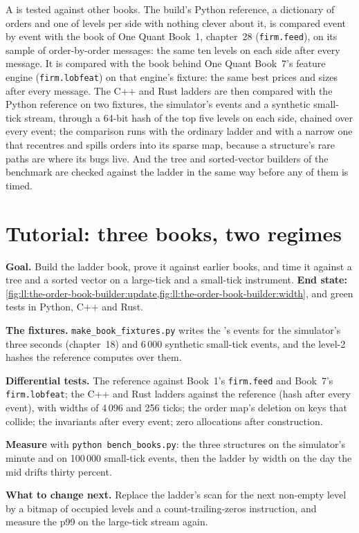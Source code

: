 A  is tested against other books. The build's Python reference, a dictionary of orders and one of levels per side
with nothing clever about it, is compared event by event with the book of One Quant Book~1, chapter~28 (\texttt{firm.feed}),
on its sample of order-by-order messages: the same ten levels on each side after every message. It is compared with the book
behind One Quant Book~7's feature engine (\texttt{firm.lobfeat}) on that engine's fixture: the same best prices and sizes after
every message. The C++ and Rust ladders are then compared with the Python reference on two fixtures, the simulator's events
and a synthetic small-tick stream, through a 64-bit hash of the top five levels on each side, chained over every event; the
comparison runs with the ordinary ladder and with a narrow one that recentres and spills orders into its sparse map, because a
structure's rare paths are where its bugs live. And the tree and sorted-vector builders of the benchmark are checked against
the ladder in the same way before any of them is timed.

\section{Tutorial: three books, two regimes}\label{tut:ll:the-order-book-builder:tut}

\begin{tutorial}
\textbf{Goal.} Build the ladder book, prove it against earlier books, and time it against a tree and a sorted vector on a
large-tick and a small-tick instrument. \textbf{End state:}
\cref{fig:ll:the-order-book-builder:update,fig:ll:the-order-book-builder:width}, and green tests in Python, C++ and Rust.
\begin{tutsteps}
\item \textbf{The fixtures.} \texttt{make\_book\_fixtures.py} writes the 's events for the simulator's three seconds
(chapter~18) and 6\,000 synthetic small-tick events, and the level-2 hashes the reference computes over them.
\item \textbf{Differential tests.} The reference against Book~1's \texttt{firm.feed} and Book~7's \texttt{firm.lobfeat}; the C++
and Rust ladders against the reference (hash after every event), with widths of 4\,096 and 256 ticks; the order map's deletion
on keys that collide; the invariants after every event; zero allocations after construction.
\item \textbf{Measure} with \texttt{python bench\_books.py}: the three structures on the simulator's minute and on 100\,000
small-tick events, then the ladder by width on the day the mid drifts thirty percent.
\end{tutsteps}
\textbf{What to change next.} Replace the ladder's scan for the next non-empty level by a bitmap of occupied levels and a
count-trailing-zeros instruction, and measure the p99 on the large-tick stream again.
\end{tutorial}

